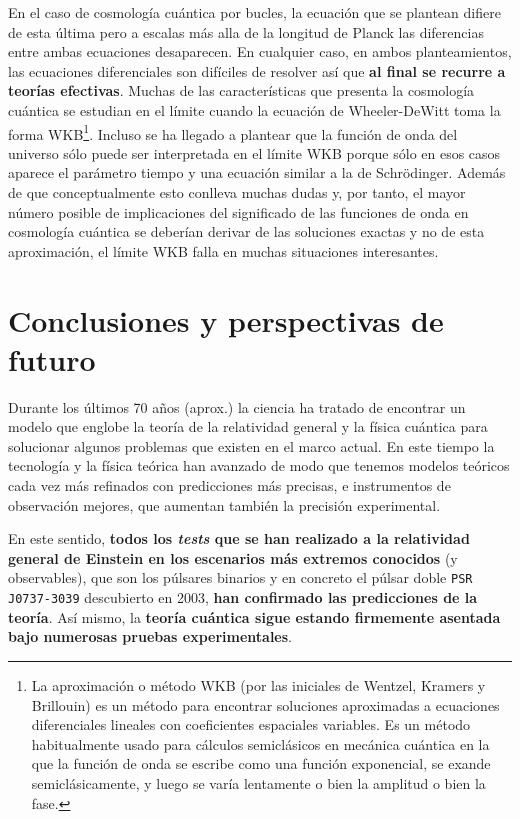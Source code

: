 \documentclass[11pt,a4paper,titlepage]{article}
\begin{document}
En el caso de cosmología cuántica por bucles, la ecuación que se plantean difiere de esta última pero a escalas más alla de la longitud de Planck las diferencias entre ambas ecuaciones desaparecen. En cualquier caso, en ambos planteamientos, las ecuaciones diferenciales son difíciles de resolver así que \textbf{al final se recurre a teorías efectivas}. Muchas de las características que presenta la cosmología cuántica se estudian en el límite cuando la ecuación de Wheeler-DeWitt toma la forma WKB\footnote{La aproximación o método WKB (por las iniciales de Wentzel, Kramers y Brillouin) es un método para encontrar soluciones aproximadas a ecuaciones diferenciales lineales con coeficientes espaciales variables. Es un método habitualmente usado para cálculos semiclásicos en mecánica cuántica en la que la función de onda se escribe como una función exponencial, se exande semiclásicamente, y luego se varía lentamente o bien la amplitud o bien la fase.}. Incluso se ha llegado a plantear que la función de onda del universo sólo puede ser interpretada en el límite WKB porque sólo en esos casos aparece el parámetro tiempo y una ecuación similar a la de Schrödinger. Además de que conceptualmente esto conlleva muchas dudas y, por tanto, el mayor número posible de implicaciones del significado de las funciones de onda en cosmología cuántica se deberían derivar de las soluciones exactas y no de esta aproximación, el límite WKB falla en muchas situaciones interesantes.




%
%
%
%
\newpage
\section{Conclusiones y perspectivas de futuro} %

Durante los últimos 70 años (aprox.) la ciencia ha tratado de encontrar un modelo que englobe la teoría de la relatividad general y la física cuántica para solucionar algunos problemas que existen en el marco actual. En este tiempo la tecnología y la física teórica han avanzado de modo que tenemos modelos teóricos cada vez más refinados con predicciones más precisas, e instrumentos de observación mejores, que aumentan también la precisión experimental.

En este sentido, \textbf{todos los \emph{tests} que se han realizado a la relatividad general de Einstein en los escenarios más extremos conocidos} (y observables), que son los púlsares binarios y en concreto el púlsar doble \texttt{PSR J0737-3039} descubierto en 2003, \textbf{han confirmado las predicciones de la teoría}. Así mismo, la \textbf{teoría cuántica sigue estando firmemente asentada bajo numerosas pruebas experimentales}.
\end{document}
